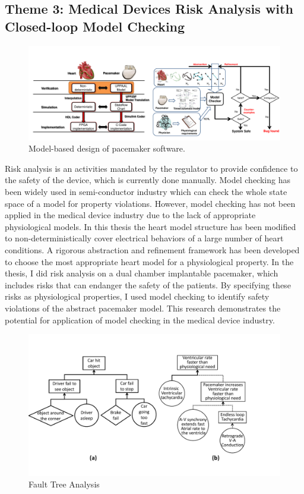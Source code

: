 \documentclass[a4paper]{article}
\begin{document}
\subsection{Theme 3: Medical Devices Risk Analysis with Closed-loop Model Checking}
\begin{figure}[t]
	\centering
	\includegraphics[scale=0.32]{figs/mb_mc.pdf}
	\caption{\small Model-based design of pacemaker software.}
	\label{fig:mb_mc}
\end{figure}
Risk analysis is an activities mandated by the regulator to provide confidence to the safety of the device, which is currently done manually.
Model checking has been widely used in semi-conductor industry which can check the whole state space of a model for property violations.
However, model checking has not been applied in the medical device industry due to the lack of appropriate physiological models.
In this thesis the heart model structure has been modified to non-deterministically cover electrical behaviors of a large number of heart conditions.
A rigorous abstraction and refinement framework has been developed to choose the most appropriate heart model for a physiological property.
In the thesis, I did risk analysis on a dual chamber implantable pacemaker, which includes risks that can endanger the safety of the patients.
By specifying these risks as physiological properties, I used model checking to identify safety violations of the abstract pacemaker model.
This research demonstrates the potential for application of model checking in the medical device industry.
\begin{figure}[b]
	\centering
	\includegraphics[scale=0.4]{figs/FTA_new.pdf}
	\caption{\small Fault Tree Analysis}
	\label{fig:FTA}
\end{figure}
\end{document}
